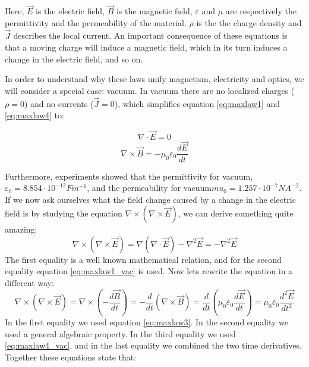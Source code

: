 Here, $\vec{E}$ is the electric field, $\vec{B}$ is the magnetic field, $\varepsilon$ and $\mu$ are respectively the permittivity and the permeability of the material. $\rho$ is the the charge density and $\vec{J}$ describes the local current. %
An important consequence of these equations is that a moving charge will induce a magnetic field, which in its turn induces a change in the electric field, and so on.

In order to understand why these laws unify magnetism, electricity and optics, we will consider a special case: vacuum. In vacuum there are no localized charges ($\rho = 0$) and no currents ($\vec{J}=0$), which simplifies equation \ref{eq:maxlaw1} and \ref{eq:maxlaw4} to: 

\begin{equation} \nabla \cdot   \vec{E} = 0 \label{eq:maxlaw1_vac}\end{equation}
\begin{equation} \nabla \times \vec{B} = -\mu_0\varepsilon_0\frac{d\vec{E}}{dt}\label{eq:maxlaw4_vac}\end{equation}

Furthermore, experiments showed that the permittivity for vacuum, $\varepsilon_0 = 8.854\cdot10^{-12} Fm^{-1}$, and the permeability for vacuum$mu_0 = 1.257 \cdot 10^{-7} N A^{-2}$. If we now ask ourselves what the field change caused by a change in the electric field is by studying the equation $\nabla \times( \nabla \times \vec{E}) $, we can derive something quite amazing:  
\[ \nabla \times( \nabla \times \vec{E}) = \nabla (\nabla \cdot
\vec{E}) -\nabla^2 \vec{E} =-\nabla^2 \vec{E} \]
The first equality is a well known mathematical relation, and for the second equality equation \ref{eq:maxlaw1_vac} is used. 
Now lets rewrite the equation in a different way:
\[\nabla \times( \nabla \times \vec{E})=
\nabla\times(-\frac{d\vec{B}}{dt}) =
-\frac{d}{dt}(\nabla\times\vec{B})=\frac{d}{dt}(\mu_0\varepsilon_0\frac{d\vec{E}}{dt})
= \mu_0\varepsilon_0\frac{d^2\vec{E}}{dt^2}\]
In the first equality we used equation \ref{eq:maxlaw3}. In the second equality we used a general algebraic property. In the third equality we used \ref{eq:maxlaw4_vac}, and in the last equality we combined the two time derivatives. Together these equations state that:

